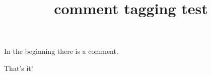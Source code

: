 \documentclass{article}
\title{comment tagging test}
\begin{document}
In the beginning there is a comment.
\begin{comment}
Comment should not appear in the PDF, it should be artifact.
\end{comment}
\begin{smalltt}
That's it!
\end{smalltt}
\end{document}

